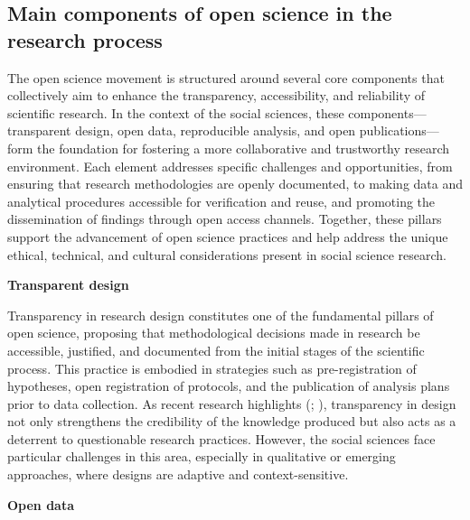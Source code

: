 \documentclass[
  english,
  letterpaper,
]{article}
\begin{document}
\subsection{Main components of open science in the research
process}\label{main-components-of-open-science-in-the-research-process}

The open science movement is structured around several core components
that collectively aim to enhance the transparency, accessibility, and
reliability of scientific research. In the context of the social
sciences, these components---transparent design, open data, reproducible
analysis, and open publications---form the foundation for fostering a
more collaborative and trustworthy research environment. Each element
addresses specific challenges and opportunities, from ensuring that
research methodologies are openly documented, to making data and
analytical procedures accessible for verification and reuse, and
promoting the dissemination of findings through open access channels.
Together, these pillars support the advancement of open science
practices and help address the unique ethical, technical, and cultural
considerations present in social science research.

\textbf{Transparent design}

Transparency in research design constitutes one of the fundamental
pillars of open science, proposing that methodological decisions made in
research be accessible, justified, and documented from the initial
stages of the scientific process. This practice is embodied in
strategies such as pre-registration of hypotheses, open registration of
protocols, and the publication of analysis plans prior to data
collection. As recent research highlights
(;
),
transparency in design not only strengthens the credibility of the
knowledge produced but also acts as a deterrent to questionable research
practices. However, the social sciences face particular challenges in
this area, especially in qualitative or emerging approaches, where
designs are adaptive and context-sensitive.

\textbf{Open data}
\end{document}
